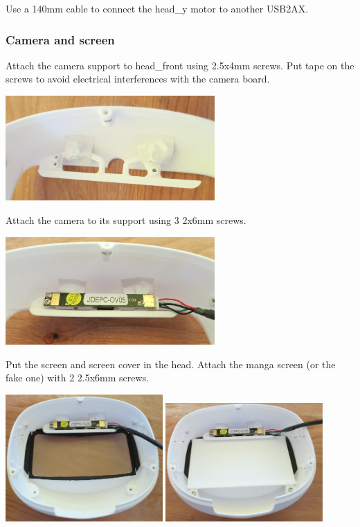\documentclass[includefoot]{article}
\begin{document}
Use a 140mm cable to connect the head\_y motor to another USB2AX.

\subsubsection{Camera and screen}

Attach the camera support to head\_front using \diameter 2.5x4mm screws. Put tape on the screws to avoid electrical interferences with the camera board.

\begin{center}
  \includegraphics[width=0.6\textwidth]{img/head_camera2}
 \end{center}

Attach the camera to its support using 3 \diameter 2x6mm screws.

\begin{center}
  \includegraphics[width=0.6\textwidth]{img/head_camera3}
 \end{center}

Put the screen and screen cover in the head. Attach the manga screen (or the fake one) with 2 \diameter 2.5x6mm screws.

\begin{center}
  \includegraphics[width=0.45\textwidth]{img/head_screen_cover}
  \includegraphics[width=0.45\textwidth]{img/head_screen}
 \end{center}
\end{document}
